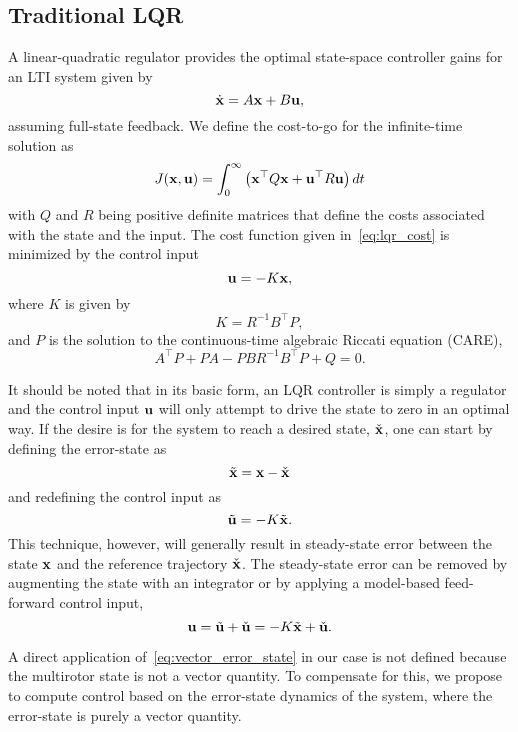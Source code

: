 
\subsection{Traditional LQR}

A linear-quadratic regulator provides the optimal state-space controller gains
for an LTI  system given by
\begin{equation}
\dot{{\bf x}}=A{\bf x}+B{\bf u},
\end{equation}
assuming full-state feedback. We define the cost-to-go for the infinite-time solution as
\begin{equation}
  J(\boldsymbol{\mathrm{x}},\boldsymbol{\mathrm{u}})=\int_{0}^{\infty}\left(\boldsymbol{\mathrm{x}}^{\top}Q\boldsymbol{\mathrm{x}}+\boldsymbol{\mathrm{u}}^{\top}R\boldsymbol{\mathrm{u}}\right)dt
\label{eq:lqr_cost}
\end{equation}
with $Q$ and $R$ being positive definite matrices that
define the costs associated with the state and the input. The cost function
given in~\eqref{eq:lqr_cost} is minimized by the control input
\begin{equation}
  \boldsymbol{\mathrm{u}} = -K\boldsymbol{\mathrm{x}},
\end{equation}
where $K$ is given by
\begin{equation}
  K = R^{-1}B^{\top}P,
\end{equation}
and $P$ is the solution to the continuous-time algebraic Riccati equation (CARE),
\begin{equation}
  A^{\top}P + PA -PBR^{-1}B^{\top}P + Q = 0.
\end{equation}

It should be noted that in its basic form, an LQR controller is simply a
regulator and the control input $\boldsymbol{\mathrm{u}}$ will only attempt to drive the state
to zero in an optimal way. If the desire is for the system to reach a desired
state, $\check{\boldsymbol{\mathrm{x}}}$, one can start by defining the error-state as
\begin{equation}
  \tilde{\boldsymbol{\mathrm{x}}}=\boldsymbol{\mathrm{x}}-\check{\boldsymbol{\mathrm{x}}}
  \label{eq:vector_error_state}
\end{equation}
and redefining the control input as
\begin{equation}
  \tilde{\boldsymbol{\mathrm{u}}} = -K\tilde{\boldsymbol{\mathrm{x}}}.
\end{equation}
This technique, however, will generally result in steady-state error between the
state $\boldsymbol{\mathrm{x}}$ and the reference trajectory $\check{\boldsymbol{\mathrm{x}}}$. The steady-state error can be removed by augmenting the state with an integrator or by applying a model-based feed-forward control input,
\begin{equation}
  \boldsymbol{\mathrm{u}} = \tilde{\boldsymbol{\mathrm{u}}} + \check{\boldsymbol{\mathrm{u}}} = -K\tilde{\boldsymbol{\mathrm{x}}} + \check{\boldsymbol{\mathrm{u}}}.
\end{equation}

A direct application of~\eqref{eq:vector_error_state} in our case is not defined
because the multirotor state is not a vector quantity.
To compensate for this, we propose to compute control based
on the error-state dynamics of the system, where the error-state is purely a vector
quantity.
